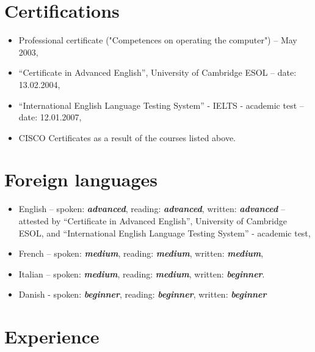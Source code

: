 \documentclass[a4paper,12pt,openany]{article}
\begin{document}
\newpage
\section{Certifications}
		\begin{itemize}
		 	\item Professional certificate ("Competences on operating the computer") – May 2003,
			\item “Certificate in Advanced English”, University of Cambridge ESOL – date: 13.02.2004,
			\item “International English Language Testing System” - IELTS - academic test – date: 12.01.2007,
			\item CISCO Certificates as a result of the courses listed above.
		\end{itemize}
	
\section{Foreign languages}
		\begin{itemize}
		 	\item English – spoken: \textit{\textbf{advanced}}, reading: \textbf{\textit{advanced}}, written: \textbf{\textit{advanced}} – attested by “Certificate in Advanced English”, University of Cambridge ESOL, and “International English Language Testing System” - academic test,
			\item French – spoken: \textbf{\textit{medium}},    reading: \textbf{\textit{medium}}, written: \textbf{\textit{medium}},
			\item Italian – spoken: \textbf{\textit{medium}}, reading: \textbf{\textit{medium}}, written: \textbf{\textit{beginner}}.
			\item Danish - spoken: \textbf{\textit{beginner}}, reading: \textbf{\textit{beginner}}, written: \textbf{\textit{beginner}} 
		\end{itemize}
\newpage
\section{Experience}
\end{document}
